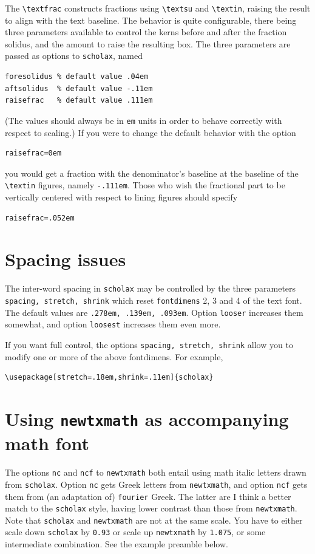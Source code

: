 \documentclass[11pt]{article}
\theoremstyle{oldplain}
\theoremstyle{plain}
\begin{document}
The \verb|\textfrac| constructs fractions using \verb|\textsu| and \verb|\textin|, raising the result to align with the text baseline. The behavior is quite configurable, there being three parameters available to control the kerns before and after the fraction solidus, and the amount to raise the resulting box. The three parameters are passed as options to {\tt scholax}, named
\begin{verbatim}
foresolidus % default value .04em
aftsolidus  % default value -.11em
raisefrac   % default value .111em
\end{verbatim}
(The values should always be in {\tt em} units in order to behave correctly with respect to scaling.)
If you were to change the default behavior with the option
\begin{verbatim}
raisefrac=0em
\end{verbatim}
you would get a fraction with the denominator's baseline  at the baseline of the \verb|\textin| figures, namely {\tt -.111em}. Those who wish the fractional part to be vertically centered with respect to lining figures should specify
\begin{verbatim}
raisefrac=.052em
\end{verbatim}


\section*{Spacing issues}
The  inter-word spacing in {\tt scholax} may be controlled by the three parameters {\tt spacing, stretch, shrink} which reset {\tt fontdimens} 2, 3 and 4 of the text font. The default values are {\tt .278em, .139em, .093em}. Option {\tt looser} increases them somewhat, and option {\tt loosest} increases them even more.

If you want full control, the options {\tt spacing, stretch, shrink} allow you to modify one or more of the above fontdimens. For example,
\begin{verbatim}
\usepackage[stretch=.18em,shrink=.11em]{scholax}
\end{verbatim}

\section*{Using \texttt{newtxmath} as accompanying math font}
The options {\tt nc} and {\tt ncf} to {\tt newtxmath} both entail using math italic letters drawn from {\tt scholax}. Option {\tt nc} gets Greek letters from {\tt newtxmath}, and option {\tt ncf} gets them from (an adaptation of) {\tt fourier} Greek. The latter are I think a better match to the {\tt scholax} style, having lower contrast than those from {\tt newtxmath}. Note that {\tt scholax} and {\tt newtxmath} are not at the same scale. You have to either scale down {\tt scholax} by {\tt 0.93} or scale up {\tt newtxmath} by {\tt 1.075}, or some intermediate combination. See the example preamble below.
\end{document}
